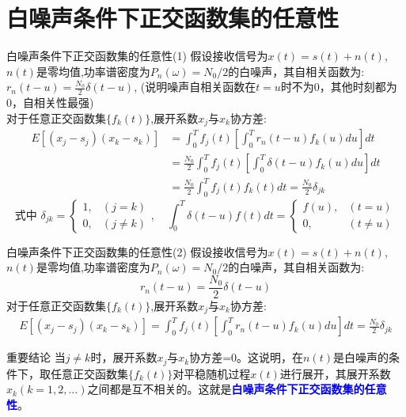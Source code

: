 \section{白噪声条件下正交函数集的任意性}

\begin{frame}{白噪声条件下正交函数集的任意性(1)}
假设接收信号为$x(t)=s(t)+n(t)$, $n(t)$是零均值,功率谱密度为$P_n(\omega)=N_0/2$的白噪声，其自相关函数为: $r_n(t-u)=\frac{N_0}{2}\delta(t-u)$, (说明噪声自相关函数在$t=u$时不为0，其他时刻都为0，自相关性最强)\\
对于任意正交函数集$\{f_k(t)\}$,展开系数$x_j$与$x_k$协方差:
\begin{align*}
E[(x_j-s_j)(x_k-s_k)]&=\int_{0}^{T}f_j(t)\left[\int_{0}^{T}r_n(t-u)f_k(u)du\right]dt\\
&=\frac{N_0}{2}\int_{0}^{T}f_j(t)\left[\int_{0}^{T}\delta(t-u)f_k(u)du\right]dt\\
&=\frac{N_0}{2}\int_{0}^{T}f_j(t)f_k(t)dt=\frac{N_0}{2}\delta_{jk}
\end{align*}
\[\text{式中 } \delta_{jk}=
\begin{cases}
1, & (j=k)\\
0, & (j\ne k) 
\end{cases},\quad
\int_0^T\delta(t-u)f(t)dt=
\begin{cases}
f(u), & (t=u)\\
0, & (t\ne u) 
\end{cases}
\]
\end{frame}

\begin{frame}{白噪声条件下正交函数集的任意性(2)}
假设接收信号为$x(t)=s(t)+n(t)$, $n(t)$是零均值,功率谱密度为$P_n(\omega)=N_0/2$的白噪声，其自相关函数为: 
\[r_n(t-u)=\frac{N_0}{2}\delta(t-u)\]
对于任意正交函数集$\{f_k(t)\}$,展开系数$x_j$与$x_k$协方差:
\begin{align*}
E[(x_j-s_j)(x_k-s_k)]=\int_{0}^{T}f_j(t)\left[\int_{0}^{T}r_n(t-u)f_k(u)du\right]dt=\frac{N_0}{2}\delta_{jk}
\end{align*}
\begin{block}{重要结论}
当$j\ne k$时，展开系数$x_j$与$x_k$协方差=0。这说明，在$n(t)$是白噪声的条件下，取任意正交函数集$\{f_k(t)\}$对平稳随机过程$x(t)$进行展开，其展开系数$x_k(k=1,2,\dots)$之间都是互不相关的。这就是\textbf{\textcolor{blue}{白噪声条件下正交函数集的任意性}}。
\end{block}
\end{frame}

